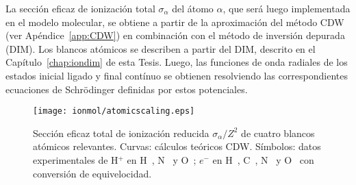 La sección eficaz de ionización total $\sigma_{\alpha}$ del átomo 
$\alpha$, que será luego implementada en el modelo molecular, se obtiene 
a partir de la aproximación del método CDW (ver Apéndice~\ref{app:CDW}) 
en combinación con el método de inversión depurada (DIM). Los blancos 
atómicos se describen a partir del DIM, descrito en el 
Capítulo~\ref{chap:iondim} de esta Tesis. Luego, las funciones de onda 
radiales de los estados inicial ligado y final contínuo se obtienen 
resolviendo las correspondientes ecuaciones de Schr\"odinger definidas 
por estos potenciales. 

\begin{figure}
\centering
\texttt{[image: ionmol/atomicscaling.eps]}
\caption[Sección eficaz total de ionización atómica CDW reducida.]
{Sección eficaz total de ionización reducida $\sigma_{\alpha}/Z^2$ 
de cuatro blancos atómicos relevantes. Curvas: cálculos teóricos CDW. 
Símbolos: datos experimentales de H$^+$ en H~\cite{Shah:81}, 
N~\cite{Rudd:85} y O~\cite{Rudd:85}; $e^-$ en 
H~\cite{Shah:87}, C~\cite{Brook:78}, N~\cite{Brook:78} y 
O~\cite{Thompson:95} con conversión de equivelocidad.}
\label{fig:atomscaling}
\end{figure} 

